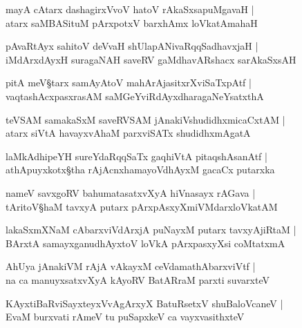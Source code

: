 \begin{shloka}
mayA cAtarx dashagirxVvoV hatoV rAkaSxsapuMgavaH |\\
atarx saMBASituM pArxpotxV barxhAmx loVkatAmahaH 
\end{shloka}

\begin{shloka}
pAvaRtAyx sahitoV deVvaH shUlapANivaRqqSadhavxjaH |\\
iMdArxdAyxH suragaNAH saveRV gaMdhavARshacx sarAkaSxsAH
\end{shloka}

\begin{shloka}
pitA meV\S tarx samAyAtoV mahArAjasitxrXviSaTxpAtf |\\
vaqtashAcxpasxrasAM saMGeYviRdAyxdharagaNeYsatxthA 
\end{shloka}

\begin{shloka}
teVSAM samakaSxM saveRVSAM jAnakiVshudidhxmicaCxtAM |\\
atarx siVtA havayxvAhaM parxviSATx shudidhxmAgatA 
\end{shloka}

\begin{shloka}
laMkAdhipeYH sureYdaRqqSaTx gaqhiVtA pitaqshAsanAtf |\\
athApuyxkotx\S tha rAjAcnxhamayoVdhAyxM gacaCx putarxka
\end{shloka}

\begin{shloka}
nameV savxgoRV bahumatasatxvXyA hiVnasayx rAGava |\\
tAritoV\S haM tavxyA putarx pArxpAsxyXmiVMdarxloVkatAM 
\end{shloka}

\begin{shloka}
lakaSxmXNaM cAbarxviVdArxjA puNayxM putarx tavxyAjiRtaM |\\
BArxtA samayxganudhAyxtoV loVkA\R{} pArxpasxyXsi coMtatxmA\R
\end{shloka}

\begin{shloka}
AhUya jAnakiVM rAjA vAkayxM ceVdamathAbarxviVtf |\\
na ca manuyxsatxvXyA kAyoRV BatARraM parxti suvarxteV 
\end{shloka}

\begin{shloka}
KAyxtiBaRviSayxteyxVvAgArxyX BatuRsetxV shuBaloVcaneV |\\
EvaM burxvati rAmeV tu puSapxkeV ca vayxvasithxteV 
\end{shloka}


